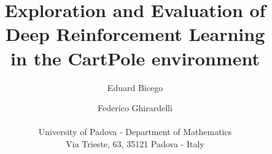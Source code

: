 \documentclass[letterpaper]{article} %
\begin{document}
%
\title{Exploration and Evaluation of Deep Reinforcement Learning \\ in the CartPole environment}

\author{Eduard Bicego \and Federico Ghirardelli\\\\
University of Padova - Department of Mathematics\\
Via Trieste, 63, 35121 Padova - Italy\\
}

\nocopyright

\maketitle













\end{document}
